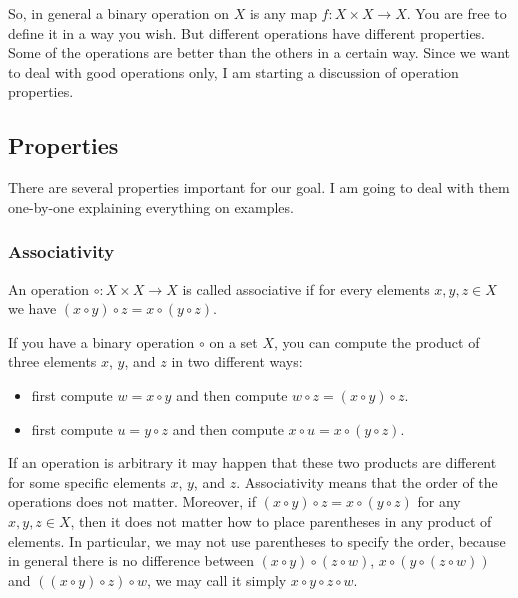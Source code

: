 So, in general a binary operation on $X$ is any map $f\colon X\times X\to X$.
You are free to define it in a way you wish.
But different operations have different properties.
Some of the operations are better than the others in a certain way.
Since we want to deal with good operations only, I am starting a discussion of operation properties.

\subsection{Properties}

There are several properties important for our goal.
I am going to deal with them one-by-one explaining everything on examples.

\subsubsection{Associativity}

\begin{definition}
An operation $\circ \colon X\times X\to X$ is called associative if for every elements $x, y, z\in X$ we have $(x\circ y)\circ z = x\circ (y\circ z)$.
\end{definition}

If you have a binary operation $\circ$ on a set $X$, you can compute the product of three elements $x$, $y$, and $z$ in two different ways:
\begin{itemize}
\item first compute $w = x\circ y$ and then compute $w \circ z = (x\circ y) \circ z$.

\item first compute $u = y \circ z$ and then compute $x \circ u = x \circ (y\circ z)$.
\end{itemize}
If an operation is arbitrary it may happen that these two products are different for some specific elements $x$, $y$, and $z$.
Associativity means that the order of the operations does not matter.
Moreover, if $(x\circ y) \circ z = x \circ (y \circ z)$ for any $x,y,z\in X$, then it does not matter how to place parentheses in any product of elements.
In particular, we may not use parentheses to specify the order, because in general there is no difference between $(x\circ y)\circ (z\circ w)$, $x\circ (y\circ (z\circ  w))$ and $((x\circ  y)\circ z)\circ w$, we may call it simply $x\circ  y \circ z \circ w$.

